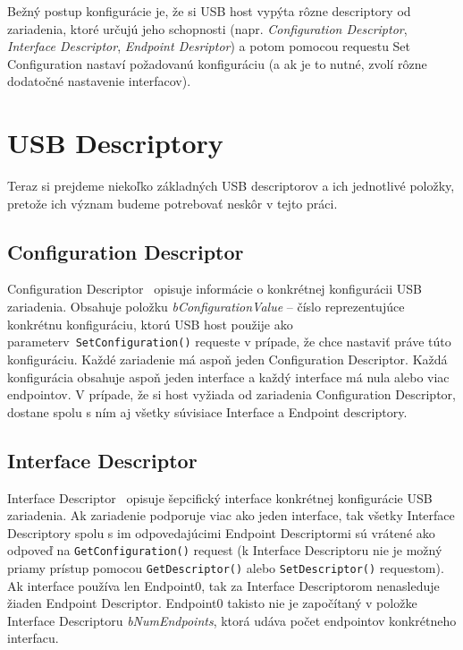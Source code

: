 Bežný postup konfigurácie je, že si USB host vypýta rôzne descriptory od zariadenia, ktoré určujú jeho schopnosti (napr. \textit{Configuration Descriptor}, \textit{Interface Descriptor}, \textit{Endpoint Desriptor}) a potom pomocou requestu Set Configuration nastaví požadovanú konfiguráciu (a ak je to nutné, zvolí rôzne dodatočné nastavenie interfacov).



\section{USB Descriptory}
Teraz si prejdeme niekoľko základných USB descriptorov a ich jednotlivé položky, pretože ich význam budeme potrebovať neskôr v tejto práci. 


\subsection*{Configuration Descriptor}
Configuration Descriptor~\cite{usb_chap9_conf_desc} opisuje informácie o konkrétnej konfigurácii USB zariadenia. Obsahuje položku \textit{bConfigurationValue} -- číslo reprezentujúce konkrétnu konfiguráciu, ktorú USB host použije ako parameter\newline v~\texttt{SetConfiguration()} requeste v prípade, že chce nastaviť práve túto konfiguráciu. Každé zariadenie má aspoň jeden Configuration Descriptor. Každá konfigurácia obsahuje aspoň jeden interface a každý interface má nula alebo viac endpointov. V prípade, že si host vyžiada od zariadenia Configuration Descriptor, dostane spolu s ním aj všetky súvisiace Interface a Endpoint descriptory.


\subsection*{Interface Descriptor}
Interface Descriptor~\cite{usb_chap9_interf_desc} opisuje šepcifický interface konkrétnej konfigurácie USB zariadenia. Ak zariadenie podporuje viac ako jeden interface, tak všetky Interface Descriptory spolu s im odpovedajúcimi Endpoint Descriptormi sú vrátené ako odpoveď na \texttt{GetConfiguration()} request (k Interface Descriptoru nie je možný priamy prístup pomocou \texttt{GetDescriptor()} alebo \texttt{SetDescriptor()} requestom). Ak interface používa len Endpoint0, tak za Interface Descriptorom nenasleduje žiaden Endpoint Descriptor. Endpoint0 takisto nie je započítaný v položke Interface Descriptoru \textit{bNumEndpoints}, ktorá udáva počet endpointov konkrétneho interfacu.


